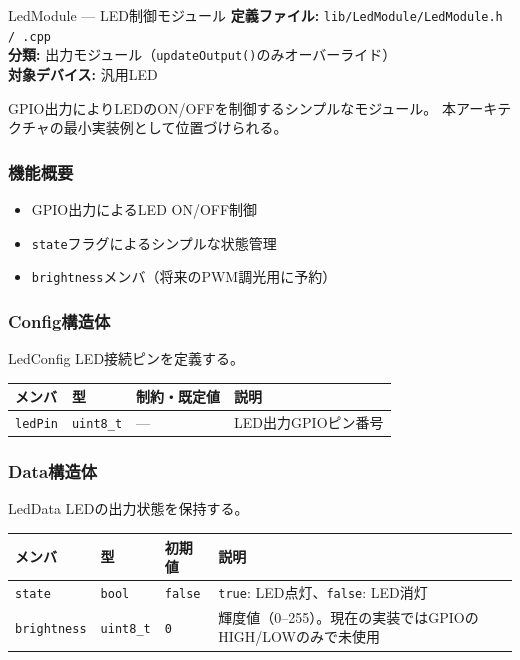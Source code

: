 \begin{apibox}{LedModule --- LED制御モジュール}
\textbf{定義ファイル:} \texttt{lib/LedModule/LedModule.h / .cpp}\\
\textbf{分類:} 出力モジュール（\texttt{updateOutput()}のみオーバーライド）\\
\textbf{対象デバイス:} 汎用LED

GPIO出力によりLEDのON/OFFを制御するシンプルなモジュール。
本アーキテクチャの最小実装例として位置づけられる。
\end{apibox}

\subsubsection{機能概要}

\begin{itemize}
    \item GPIO出力によるLED ON/OFF制御
    \item \texttt{state}フラグによるシンプルな状態管理
    \item \texttt{brightness}メンバ（将来のPWM調光用に予約）
\end{itemize}

\subsubsection{Config構造体}

\begin{funcblock}{LedConfig}
LED接続ピンを定義する。

\begin{longtable}{l l l p{5.5cm}}
\toprule
\textbf{メンバ} & \textbf{型} & \textbf{制約・既定値} & \textbf{説明} \\
\midrule
\endhead
\texttt{ledPin} & \texttt{uint8\_t} & --- & LED出力GPIOピン番号 \\
\bottomrule
\end{longtable}
\end{funcblock}

\subsubsection{Data構造体}

\begin{funcblock}{LedData}
LEDの出力状態を保持する。

\begin{longtable}{l l l p{5.5cm}}
\toprule
\textbf{メンバ} & \textbf{型} & \textbf{初期値} & \textbf{説明} \\
\midrule
\endhead
\texttt{state}      & \texttt{bool}     & \texttt{false} & \texttt{true}: LED点灯、\texttt{false}: LED消灯 \\
\texttt{brightness} & \texttt{uint8\_t} & \texttt{0}     & 輝度値（0--255）。現在の実装ではGPIOのHIGH/LOWのみで未使用 \\
\bottomrule
\end{longtable}
\end{funcblock}

